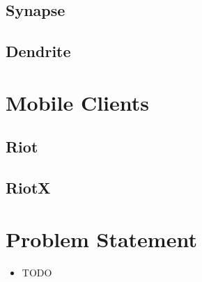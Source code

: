 \subsection{Synapse}
\subsection{Dendrite}

\section{Mobile Clients}
\subsection{Riot}
\subsection{RiotX}

\section{Problem Statement}
\begin{itemize}
    \item TODO
\end{itemize}

